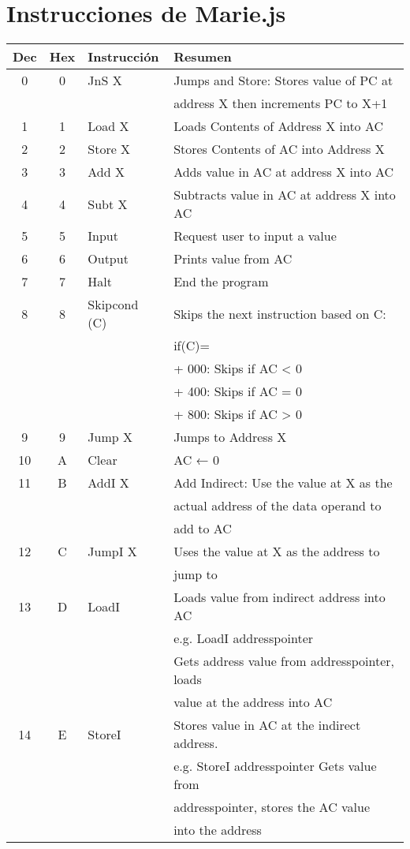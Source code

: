 \documentclass[12pt]{article}
\begin{document}
\section{Instrucciones de Marie.js}
\label{sec:org1b3fc0f}
\begin{center}
\begin{tabular}{|c|c|l|l|}
\hline
\textbf{Dec} & \textbf{Hex} & \textbf{Instrucción} & \textbf{Resumen}\\
\hline
0 & 0 & JnS X & Jumps and Store: Stores value of PC at\\
 &  &  & address X then increments PC to X+1\\
\hline
1 & 1 & Load X & Loads Contents of Address X into AC\\
\hline
2 & 2 & Store X & Stores Contents of AC into Address X\\
\hline
3 & 3 & Add X & Adds value in AC at address X into AC\\
\hline
4 & 4 & Subt X & Subtracts value in AC at address X into AC\\
\hline
5 & 5 & Input & Request user to input a value\\
\hline
6 & 6 & Output & Prints value from AC\\
\hline
7 & 7 & Halt & End the program\\
\hline
8 & 8 & Skipcond (C) & Skips the next instruction based on C:\\
 &  &  & if(C)=\\
 &  &  & + 000: Skips if AC < 0\\
 &  &  & + 400: Skips if AC = 0\\
 &  &  & + 800: Skips if AC > 0\\
\hline
9 & 9 & Jump X & Jumps to Address X\\
\hline
10 & A & Clear & AC ← 0\\
\hline
11 & B & AddI X & Add Indirect: Use the value at X as the\\
 &  &  & actual address of the data operand to\\
 &  &  & add to AC\\
\hline
12 & C & JumpI X & Uses the value at X as the address to\\
 &  &  & jump to\\
\hline
13 & D & LoadI & Loads value from indirect address into AC\\
 &  &  & e.g. LoadI addresspointer\\
 &  &  & Gets address value from addresspointer, loads\\
 &  &  & value at the address into AC\\
\hline
14 & E & StoreI & Stores value in AC at the indirect address.\\
 &  &  & e.g. StoreI addresspointer Gets value from\\
 &  &  & addresspointer, stores the AC value\\
 &  &  & into the address\\
\hline
\end{tabular}
\end{center}
\pagebreak
\end{document}
